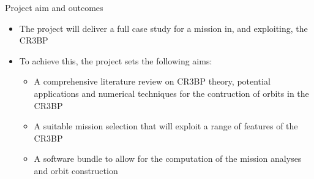 \documentclass[10pt]{beamer}
\begin{document}

%
%

\begin{frame}{Project aim and outcomes}
	\begin{itemize}
		\item The project will deliver a full case study for a mission in, and exploiting, the CR3BP
		\item To achieve this, the project sets the following aims:
			\begin{itemize}
				\item A comprehensive literature review on CR3BP theory, potential applications and numerical techniques for the contruction of orbits in the CR3BP
				\item A suitable mission selection that will exploit a range of features of the CR3BP
				\item A software bundle to allow for the computation of the mission analyses and orbit construction
			\end{itemize}
	\end{itemize}
\end{frame}
\end{document}
